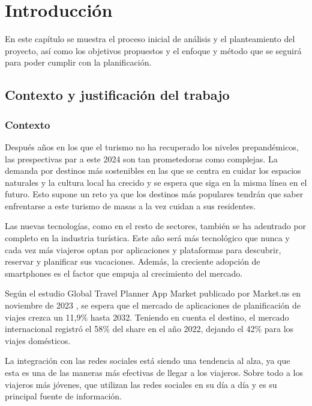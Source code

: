 \chapter{Introducción}

     \parbox{1\linewidth}{En este capítulo se muestra el proceso inicial de análisis y el planteamiento del proyecto, así como los objetivos propuestos y el enfoque y método que se seguirá para poder cumplir con la planificación.}

\section{Contexto y justificación del trabajo}
\subsection{Contexto} 
Después años en los que el turismo no ha recuperado los niveles prepandémicos, las prespectivas par a este 2024 son tan prometedoras como complejas. La demanda por destinos más sostenibles en las  que se centra en cuidar los espacios naturales y la cultura local ha crecido y se espera que siga en la misma línea en el futuro. Esto supone un reto ya que los destinos más populares tendrán que saber enfrentarse a este turismo de masas a la vez cuidan a sus residentes. 

Las nuevas tecnologías, como en el resto de sectores, también se ha adentrado por completo en la industria turística. Este año será más tecnológico que nunca y cada vez más viajeros optan por aplicaciones y plataformas para descubrir, reservar y planificar sus vacaciones. Además, la creciente adopción de smartphones es el factor que empuja al crecimiento del mercado.

Según el estudio Global Travel Planner App Market publicado por Market.us en noviembre de 2023 \cite{market-us-travel-app}, se espera que el mercado de aplicaciones de planificación de viajes crezca un 11,9\% hasta 2032. Teniendo en cuenta el destino, el mercado internacional registró el 58\% del share en el año 2022, dejando el 42\% para los viajes domésticos.

La integración con las redes sociales está siendo una tendencia al alza, ya que esta es una de las maneras más efectivas de llegar a los viajeros. Sobre todo a los viajeros más jóvenes, que utilizan las redes sociales en su día a día y es su principal fuente de información.

